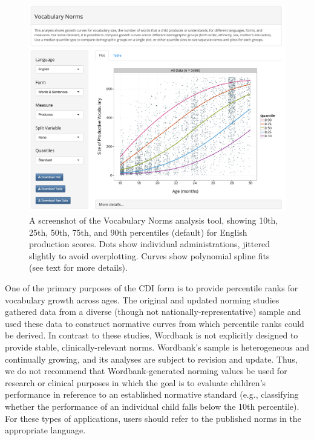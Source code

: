 \documentclass[doc,noapacite]{apa2}
\begin{document}
\begin{figure}[t]
\includegraphics[width=6in]{figures/normsapp.png}
\caption{\label{fig:norms} A screenshot of the Vocabulary Norms analysis tool, showing 10th, 25th, 50th, 75th, and 90th percentiles (default) for English production scores. Dots show individual administrations, jittered slightly to avoid overplotting. Curves show polynomial spline fits (see text for more details).}
\end{figure}

One of the primary purposes of the CDI form is to provide percentile ranks for vocabulary growth across ages. The original and updated norming studies \cite{fenson1994,fenson2007} gathered data from a diverse (though not nationally-representative) sample and used these data to construct normative curves from which percentile ranks could be derived. In contrast to these studies, Wordbank is not explicitly designed to provide stable, clinically-relevant norms. Wordbank's sample is heterogeneous and continually growing, and its analyses are subject to revision and update. Thus, we do not recommend that Wordbank-generated norming values be used for research or clinical purposes in which the goal is to evaluate children's performance in reference to an established normative standard (e.g., classifying whether the performance of an individual child falls below the 10th percentile). For these types of applications, users should refer to the published norms in the appropriate language. 
\end{document}
